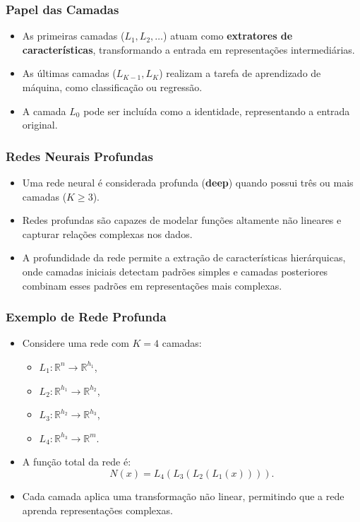 \documentclass{beamer}
\begin{document}
\begin{frame}
\frametitle{Papel das Camadas}
\begin{itemize}
    \item As primeiras camadas (\( L_1, L_2, \ldots \)) atuam como \textbf{extratores de características}, transformando a entrada em representações intermediárias.
    \item As últimas camadas (\( L_{K-1}, L_K \)) realizam a tarefa de aprendizado de máquina, como classificação ou regressão.
    \item A camada \( L_0 \) pode ser incluída como a identidade, representando a entrada original.
\end{itemize}
\end{frame}

\begin{frame}
\frametitle{Redes Neurais Profundas}
\begin{itemize}
    \item Uma rede neural é considerada profunda (\textbf{deep}) quando possui três ou mais camadas (\( K \geq 3 \)).
    \item Redes profundas são capazes de modelar funções altamente não lineares e capturar relações complexas nos dados.
    \item A profundidade da rede permite a extração de características hierárquicas, onde camadas iniciais detectam padrões simples e camadas posteriores combinam esses padrões em representações mais complexas.
\end{itemize}
\end{frame}

\begin{frame}
\frametitle{Exemplo de Rede Profunda}
\begin{itemize}
    \item Considere uma rede com \( K = 4 \) camadas:
    \begin{itemize}
        \item \( L_1: \mathbb{R}^n \to \mathbb{R}^{h_1} \),
        \item \( L_2: \mathbb{R}^{h_1} \to \mathbb{R}^{h_2} \),
        \item \( L_3: \mathbb{R}^{h_2} \to \mathbb{R}^{h_3} \),
        \item \( L_4: \mathbb{R}^{h_3} \to \mathbb{R}^m \).
    \end{itemize}
    \item A função total da rede é:
    \[
    N(x) = L_4(L_3(L_2(L_1(x)))).
    \]
    \item Cada camada aplica uma transformação não linear, permitindo que a rede aprenda representações complexas.
\end{itemize}
\end{frame}
\end{document}
